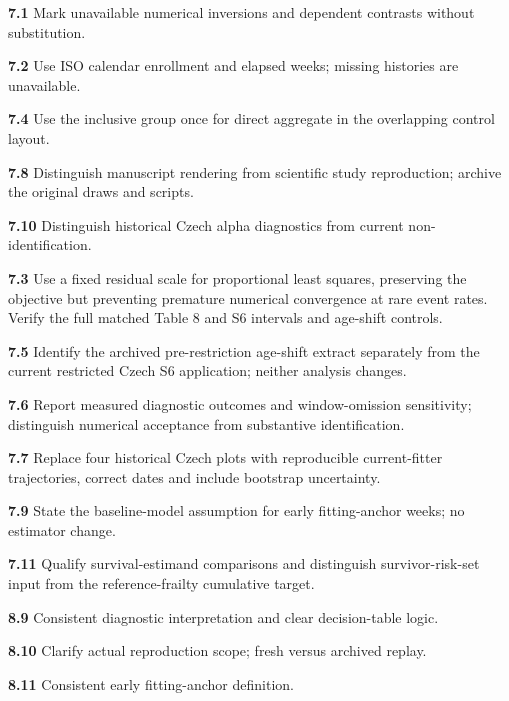 \documentclass[
]{article}
\begin{document}
\par\hypertarget{issue-7.1}{}\textbf{7.1} Mark unavailable numerical inversions and dependent contrasts without substitution.
\par\hypertarget{issue-7.2}{}\textbf{7.2} Use ISO calendar enrollment and elapsed weeks; missing histories are unavailable.
\par\hypertarget{issue-7.4}{}\textbf{7.4} Use the inclusive group once for direct aggregate in the overlapping control layout.
\par\hypertarget{issue-7.8}{}\textbf{7.8} Distinguish manuscript rendering from scientific study reproduction; archive the original draws and scripts.
\par\hypertarget{issue-7.10}{}\textbf{7.10} Distinguish historical Czech alpha diagnostics from current non-identification.
\par\hypertarget{issue-7.3}{}\textbf{7.3} Use a fixed residual scale for proportional least squares, preserving the objective but preventing premature numerical convergence at rare event rates. Verify the full matched Table 8 and S6 intervals and age-shift controls.
\par\hypertarget{issue-7.5}{}\textbf{7.5} Identify the archived pre-restriction age-shift extract separately from the current restricted Czech S6 application; neither analysis changes.
\par\hypertarget{issue-7.6}{}\textbf{7.6} Report measured diagnostic outcomes and window-omission sensitivity; distinguish numerical acceptance from substantive identification.
\par\hypertarget{issue-7.7}{}\textbf{7.7} Replace four historical Czech plots with reproducible current-fitter trajectories, correct dates and include bootstrap uncertainty.
\par\hypertarget{issue-7.9}{}\textbf{7.9} State the baseline-model assumption for early fitting-anchor weeks; no estimator change.
\par\hypertarget{issue-7.11}{}\textbf{7.11} Qualify survival-estimand comparisons and distinguish survivor-risk-set input from the reference-frailty cumulative target.
\par\hypertarget{issue-8.9}{}\textbf{8.9} Consistent diagnostic interpretation and clear decision-table logic.
\par\hypertarget{issue-8.10}{}\textbf{8.10} Clarify actual reproduction scope; fresh versus archived replay.
\par\hypertarget{issue-8.11}{}\textbf{8.11} Consistent early fitting-anchor definition.
\end{document}
